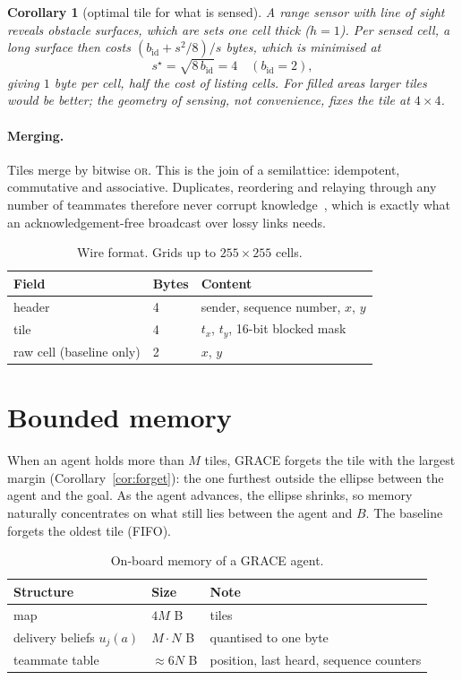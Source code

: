 \documentclass[11pt,a4paper]{article}
\newtheorem{corollary}{Corollary}
\theoremstyle{definition}
\begin{document}
\begin{corollary}[optimal tile for what is sensed]\label{cor:tile}
A range sensor with line of sight reveals obstacle surfaces, which are sets one cell thick ($h=1$). Per sensed cell, a long surface then costs $(b_{\mathrm{id}}+s^2/8)/s$ bytes, which is minimised at
\[
s^\star=\sqrt{8\,b_{\mathrm{id}}}=4\quad(b_{\mathrm{id}}=2),
\]
giving $1$ byte per cell, half the cost of listing cells. For filled areas larger tiles would be better; the geometry of sensing, not convenience, fixes the tile at $4\times4$.
\end{corollary}

\paragraph{Merging.} Tiles merge by bitwise \textsc{or}. This is the join of a semilattice: idempotent, commutative and associative. Duplicates, reordering and relaying through any number of teammates therefore never corrupt knowledge~\cite{shapiro11}, which is exactly what an acknowledgement-free broadcast over lossy links needs.

\begin{table}[h]\centering\small
\begin{tabular}{lll}
\toprule
Field & Bytes & Content\\\midrule
header & 4 & sender, sequence number, $x$, $y$\\
tile & 4 & $t_x$, $t_y$, 16-bit blocked mask\\
raw cell (baseline only) & 2 & $x$, $y$\\\bottomrule
\end{tabular}
\caption{Wire format. Grids up to $255\times255$ cells.}
\end{table}

\section{Bounded memory}\label{sec:memory}

When an agent holds more than $M$ tiles, GRACE forgets the tile with the largest margin (Corollary~\ref{cor:forget}): the one furthest outside the ellipse between the agent and the goal. As the agent advances, the ellipse shrinks, so memory naturally concentrates on what still lies between the agent and $B$. The baseline forgets the oldest tile (FIFO).

\begin{table}[h]\centering\small
\begin{tabular}{lll}
\toprule
Structure & Size & Note\\\midrule
map & $4M$ B & tiles\\
delivery beliefs $u_j(a)$ & $M\cdot N$ B & quantised to one byte\\
teammate table & $\approx 6N$ B & position, last heard, sequence counters\\
\bottomrule
\end{tabular}
\caption{On-board memory of a GRACE agent.}
\label{tab:memory}
\end{table}
\end{document}
